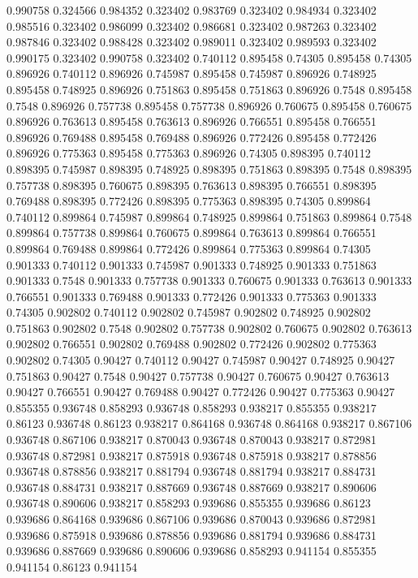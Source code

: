 0.990758 0.324566
0.984352 0.323402
0.983769 0.323402
0.984934 0.323402
0.985516 0.323402
0.986099 0.323402
0.986681 0.323402
0.987263 0.323402
0.987846 0.323402
0.988428 0.323402
0.989011 0.323402
0.989593 0.323402
0.990175 0.323402
0.990758 0.323402
0.740112 0.895458
0.74305 0.895458
0.74305 0.896926
0.740112 0.896926
0.745987 0.895458
0.745987 0.896926
0.748925 0.895458
0.748925 0.896926
0.751863 0.895458
0.751863 0.896926
0.7548 0.895458
0.7548 0.896926
0.757738 0.895458
0.757738 0.896926
0.760675 0.895458
0.760675 0.896926
0.763613 0.895458
0.763613 0.896926
0.766551 0.895458
0.766551 0.896926
0.769488 0.895458
0.769488 0.896926
0.772426 0.895458
0.772426 0.896926
0.775363 0.895458
0.775363 0.896926
0.74305 0.898395
0.740112 0.898395
0.745987 0.898395
0.748925 0.898395
0.751863 0.898395
0.7548 0.898395
0.757738 0.898395
0.760675 0.898395
0.763613 0.898395
0.766551 0.898395
0.769488 0.898395
0.772426 0.898395
0.775363 0.898395
0.74305 0.899864
0.740112 0.899864
0.745987 0.899864
0.748925 0.899864
0.751863 0.899864
0.7548 0.899864
0.757738 0.899864
0.760675 0.899864
0.763613 0.899864
0.766551 0.899864
0.769488 0.899864
0.772426 0.899864
0.775363 0.899864
0.74305 0.901333
0.740112 0.901333
0.745987 0.901333
0.748925 0.901333
0.751863 0.901333
0.7548 0.901333
0.757738 0.901333
0.760675 0.901333
0.763613 0.901333
0.766551 0.901333
0.769488 0.901333
0.772426 0.901333
0.775363 0.901333
0.74305 0.902802
0.740112 0.902802
0.745987 0.902802
0.748925 0.902802
0.751863 0.902802
0.7548 0.902802
0.757738 0.902802
0.760675 0.902802
0.763613 0.902802
0.766551 0.902802
0.769488 0.902802
0.772426 0.902802
0.775363 0.902802
0.74305 0.90427
0.740112 0.90427
0.745987 0.90427
0.748925 0.90427
0.751863 0.90427
0.7548 0.90427
0.757738 0.90427
0.760675 0.90427
0.763613 0.90427
0.766551 0.90427
0.769488 0.90427
0.772426 0.90427
0.775363 0.90427
0.855355 0.936748
0.858293 0.936748
0.858293 0.938217
0.855355 0.938217
0.86123 0.936748
0.86123 0.938217
0.864168 0.936748
0.864168 0.938217
0.867106 0.936748
0.867106 0.938217
0.870043 0.936748
0.870043 0.938217
0.872981 0.936748
0.872981 0.938217
0.875918 0.936748
0.875918 0.938217
0.878856 0.936748
0.878856 0.938217
0.881794 0.936748
0.881794 0.938217
0.884731 0.936748
0.884731 0.938217
0.887669 0.936748
0.887669 0.938217
0.890606 0.936748
0.890606 0.938217
0.858293 0.939686
0.855355 0.939686
0.86123 0.939686
0.864168 0.939686
0.867106 0.939686
0.870043 0.939686
0.872981 0.939686
0.875918 0.939686
0.878856 0.939686
0.881794 0.939686
0.884731 0.939686
0.887669 0.939686
0.890606 0.939686
0.858293 0.941154
0.855355 0.941154
0.86123 0.941154
